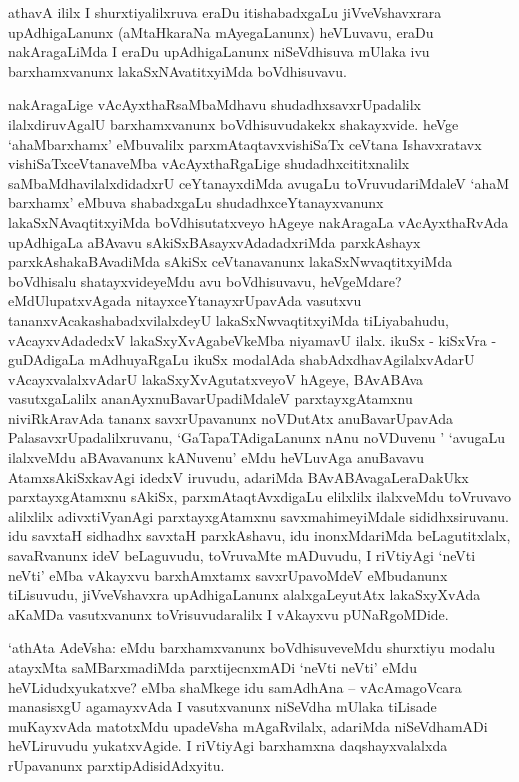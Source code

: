 \centerline{}

\begin{artha}
athavA ililx I shurxtiyalilxruva eraDu itishabadxgaLu jiVveVshavxrara
upAdhigaLanunx (aMtaHkaraNa mAyegaLanunx) heVLuvavu, eraDu
nakAragaLiMda I eraDu upAdhigaLanunx niSeVdhisuva mUlaka ivu
barxhamxvanunx lakaSxNAvatitxyiMda boVdhisuvavu.

nakAragaLige vAcAyxthaRsaMbaMdhavu shudadhxsavxrUpadalilx
ilalxdiruvAgalU barxhamxvanunx boVdhisuvudakekx shakayxvide. heVge
`ahaMbarxhamx' eMbuvalilx parxmAtaqtavxvishiSaTx ceVtana Ishavxratavx
vishiSaTxceVtanaveMba vAcAyxthaRgaLige shudadhxcititxnalilx
saMbaMdhavilalxdidadxrU ceYtanayxdiMda avugaLu toVruvudariMdaleV `ahaM
barxhamx' eMbuva shabadxgaLu shudadhxceYtanayxvanunx
lakaSxNAvaqtitxyiMda boVdhisutatxveyo hAgeye nakAragaLa vAcAyxthaRvAda
upAdhigaLa aBAvavu sAkiSxBAsayxvAdadadxriMda parxkAshayx
parxkAshakaBAvadiMda sAkiSx ceVtanavanunx lakaSxNwvaqtitxyiMda
boVdhisalu shatayxvideyeMdu avu boVdhisuvavu, heVgeMdare?
eMdUlupatxvAgada nitayxceYtanayxrUpavAda vasutxvu
tananxvAcakashabadxvilalxdeyU lakaSxNwvaqtitxyiMda tiLiyabahudu,
vAcayxvAdadedxV lakaSxyXvAgabeVkeMba niyamavU ilalx. ikuSx - kiSxVra -
guDAdigaLa mAdhuyaRgaLu ikuSx modalAda shabAdxdhavAgilalxvAdarU vAcayxvalalxvAdarU lakaSxyXvAgutatxveyoV hAgeye, BAvABAva
vasutxgaLalilx ananAyxnuBavarUpadiMdaleV parxtayxgAtamxnu
niviRkAravAda tananx savxrUpavanunx noVDutAtx anuBavarUpavAda
PalasavxrUpadalilxruvanu, `GaTapaTAdigaLanunx nAnu noVDuvenu '
`avugaLu ilalxveMdu aBAvavanunx kANuvenu' eMdu heVLuvAga anuBavavu
AtamxsAkiSxkavAgi idedxV iruvudu, adariMda BAvABAvagaLeraDakUkx
parxtayxgAtamxnu sAkiSx, parxmAtaqtAvxdigaLu elilxlilx ilalxveMdu
toVruvavo alilxlilx adivxtiVyanAgi parxtayxgAtamxnu savxmahimeyiMdale
sididhxsiruvanu. idu savxtaH sidhadhx savxtaH parxkAshavu, idu
inonxMdariMda beLagutitxlalx, savaRvanunx ideV beLaguvudu, toVruvaMte
mADuvudu, I riVtiyAgi `neVti neVti' eMba vAkayxvu barxhAmxtamx
savxrUpavoMdeV eMbudanunx tiLisuvudu, jiVveVshavxra upAdhigaLanunx
alalxgaLeyutAtx lakaSxyXvAda aKaMDa vasutxvanunx toVrisuvudaralilx I
vAkayxvu pUNaRgoMDide.

`athAta AdeVsha: eMdu barxhamxvanunx boVdhisuveveMdu shurxtiyu modalu
atayxMta saMBarxmadiMda parxtijecnxmADi `neVti neVti' eMdu heVLidudxyukatxve? eMba shaMkege
idu samAdhAna -- vAcAmagoVcara manasisxgU agamayxvAda I vasutxvanunx
niSeVdha mUlaka tiLisade muKayxvAda matotxMdu upadeVsha mAgaRvilalx,
adariMda niSeVdhamADi heVLiruvudu yukatxvAgide. I riVtiyAgi barxhamxna
daqshayxvalalxda rUpavanunx parxtipAdisidAdxyitu.
\end{artha}

